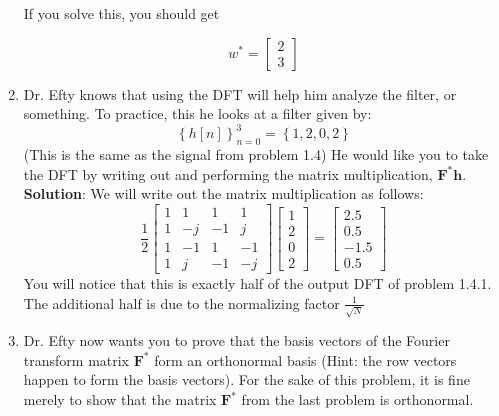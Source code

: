 \documentclass{article}
\begin{document}
\begin{enumerate}
    If you solve this, you should get 

    $$ w^* = 
    \begin{bmatrix}
        2 \\
        3 
    \end{bmatrix}
    $$

    \newpage
    \item Dr. Efty knows that using the DFT will help him analyze the filter, or something. To practice, this he looks at a filter given by:
    $$\left\{h[n]\right\}_{n=0}^{3} = \left\{ 1, 2, 0, 2 \right\}$$
    (This is the same as the signal from problem 1.4) He would like you to take the DFT by writing out and performing the matrix multiplication, $\boldsymbol{F^*h}$.\\

    \textbf{Solution}: We will write out the matrix multiplication as follows:
    $$
    \frac{1}{2}
    \begin{bmatrix}
        1 &  1 &  1 & 1 \\
        1 & -j & -1 & j \\
        1 & -1 & 1 & -1 \\
        1 & j & -1 & -j 
        
    \end{bmatrix}
    \begin{bmatrix}
        1 \\
        2 \\
        0 \\
        2
    \end{bmatrix}
    = 
    \begin{bmatrix}
        2.5 \\
        0.5 \\
        -1.5 \\
        0.5
    \end{bmatrix}
    $$
    You will notice that this is exactly half of the output DFT of problem 1.4.1. The additional half is due to the normalizing factor $\frac{1}{\sqrt{N}}$

    \newpage
    
    \item Dr. Efty now wants you to prove that the basis vectors of the Fourier transform matrix $\boldsymbol{F^*}$ form an orthonormal basis (Hint: the row vectors happen to form the basis vectors). For the sake of this problem, it is fine merely to show that the matrix $\boldsymbol{F^*}$ from the last problem is orthonormal.\\


\end{enumerate}
\end{document}
